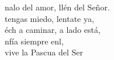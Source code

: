 \begin{cancion}
\begin{chorus}
	nalo del amor, llén del Señor. \\
	 tengas miedo, lentate ya, \\
	éch a caminar, a lado está,\\
	nfía siempre enl, \\
	vive la Pascua del Ser \\
	\end{chorus}%
	\jump\\
\end{cancion}%

